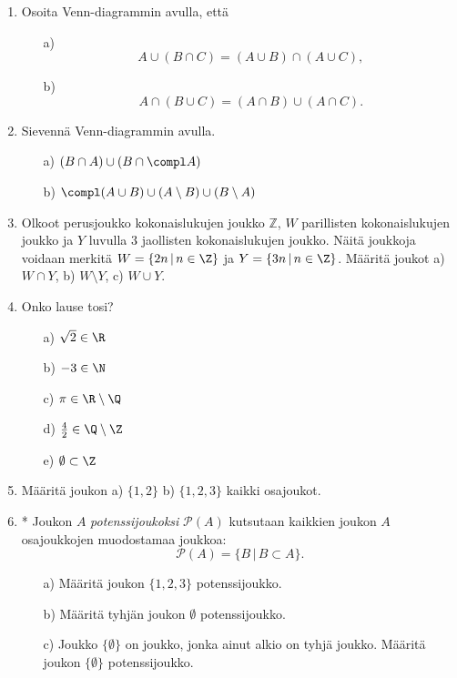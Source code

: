 \begin{enumerate}
\item Osoita Venn-diagrammin avulla, että
\begin{itemize}
\item[a)] 
\[
A\cup (B \cap C) = (A\cup B)\cap(A\cup C),
\]
\item[b)] 
\[
A\cap (B \cup C) = (A\cap B)\cup(A\cap C).
\]
\end{itemize}

\item Sievennä Venn-diagrammin avulla.
\begin{itemize}
\item[a)] $(B\cap A) \cup (B \cap \compl A)$
\item[b)] $\compl (A\cup B) \cup (A \setminus B) \cup (B \setminus A)$
\end{itemize}

\item
Olkoot perusjoukko kokonaislukujen joukko $\mathbb{Z}$, $W$ parillisten kokonaislukujen joukko ja $Y$ luvulla $3$ jaollisten kokonaislukujen joukko. Näitä joukkoja voidaan merkitä $W = \{2n\,|\, n\in\Z\}$ ja $Y = \{3n \,|\, n \in \Z\}$. Määritä joukot a) $W \cap Y$, b) $W \setminus Y$, c) $W \cup Y$.

\item Onko lause tosi?
\begin{itemize}
\item[a)] $\sqrt{2} \in \R$
\item[b)] $-3 \in \N$
\item[c)] $\pi \in \R \setminus \Q$
\item[d)] $\frac{4}{2} \in \Q \setminus \Z$
\item[e)] $\emptyset \subset \Z$
\end{itemize}

\item Määritä joukon a) $\{1,2\}$ b) $\{1,2,3\}$ kaikki osajoukot.

\item * %
Joukon $A$ {\em potenssijoukoksi} $\mathcal{P}(A)$ kutsutaan kaikkien joukon $A$ osajoukkojen muodostamaa joukkoa:
\[
\mathcal{P}(A)=\{ B \, | \, B\subset A\}.
\]
\begin{itemize}
\item[a)] Määritä joukon $\{1,2,3\}$ potenssijoukko.
\item[b)] Määritä tyhjän joukon $\emptyset$ potenssijoukko.
\item[c)] Joukko $\{\emptyset\}$ on joukko, jonka ainut alkio on tyhjä joukko. Määritä joukon $\{\emptyset\}$ potenssijoukko.
\end{itemize}


\end{enumerate}

